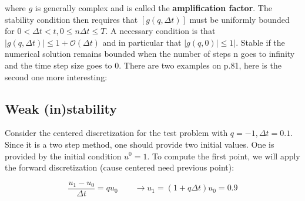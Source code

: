 where $g$ is generally complex and is called the \textbf{amplification factor}. The stability condition then requires that $[g(q, \Delta t)]$ must be uniformly bounded for $0<\Delta t < t, 0\leq n\Delta t \leq T$. A necessary condition is that $|g(q,\Delta t)|\leq 1+ \mathcal{O}(\Delta t)$ and in particular that $|g(q, 0)|\leq 1|$. Stable if the numerical solution remains bounded when the number of steps n goes to infinity and the time step size goes to 0. There are two examples on p.81, here is the second one more interesting: 


\subsection{Weak (in)stability}
Consider the centered discretization for the test problem with $q=-1, \Delta t =0.1$. Since it is a two step method, one should provide two initial values. One is provided by the initial condition $u^0 = 1$. To compute the first point, we will apply the forward discretization (cause centered need previous point):

\begin{equation}
\frac{u_1-u_0}{\Delta t} = q u_0 \qquad \rightarrow u _1 = (1+ q\Delta t) u _0 = 0.9
\end{equation}

